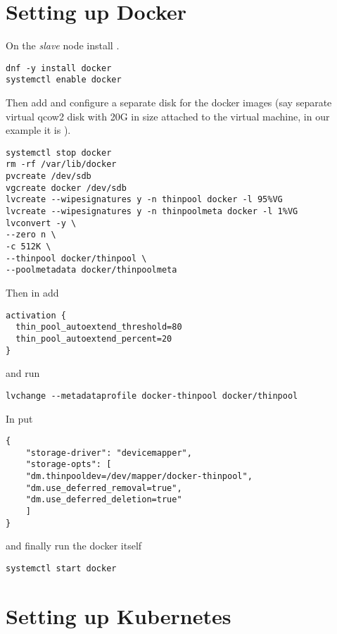 \section{Setting up Docker}
\label{sec:setup-docker}

On the \emph{slave} node install .

\begin{lstlisting}
dnf -y install docker
systemctl enable docker
\end{lstlisting}

Then add and configure a separate disk for the docker images
(say separate virtual qcow2 disk with 20G in size attached to
the virtual machine, in our example it is ).

\begin{lstlisting}
systemctl stop docker
rm -rf /var/lib/docker
pvcreate /dev/sdb
vgcreate docker /dev/sdb
lvcreate --wipesignatures y -n thinpool docker -l 95%VG
lvcreate --wipesignatures y -n thinpoolmeta docker -l 1%VG
lvconvert -y \
--zero n \
-c 512K \
--thinpool docker/thinpool \
--poolmetadata docker/thinpoolmeta
\end{lstlisting}

Then in  add

\begin{lstlisting}
activation {
  thin_pool_autoextend_threshold=80
  thin_pool_autoextend_percent=20
}
\end{lstlisting}

and run

\begin{lstlisting}
lvchange --metadataprofile docker-thinpool docker/thinpool
\end{lstlisting}

In  put

\begin{lstlisting}
{
    "storage-driver": "devicemapper",
    "storage-opts": [
    "dm.thinpooldev=/dev/mapper/docker-thinpool",
    "dm.use_deferred_removal=true",
    "dm.use_deferred_deletion=true"
    ]
}
\end{lstlisting}

and finally run the docker itself

\begin{lstlisting}
systemctl start docker
\end{lstlisting}

\section{Setting up Kubernetes}
\label{sec:setup-kuber}


